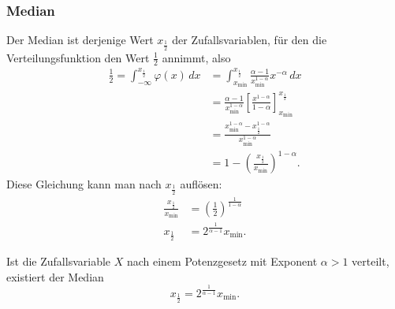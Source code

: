 \subsubsection{Median} \label{subsubsection-median}
Der Median ist derjenige Wert $x_{\frac12}$ der Zufallsvariablen,
für den die Verteilungsfunktion den Wert $\frac12$ annimmt, also
\begin{align*}
\frac12=\int_{-\infty}^{x_{\frac12}}\varphi(x)\,dx
&=
\int_{x_{\min}}^{x_{\frac12}}
\frac{\alpha-1}{x_{\min}^{1-\alpha}}
x^{-\alpha}\,dx
\\
&=
\frac{\alpha-1}{x_{\min}^{1-\alpha}}\left[
\frac{x^{1-\alpha}}{1-\alpha}
\right]_{x_{\min}}^{x_{\frac12}}
\\
&=
\frac{x_{\min}^{1-\alpha}-x_{\frac12}^{1-\alpha}}{x_{\min}^{1-\alpha}}
\\
&=
1-\left(
\frac{x_{\frac12}}{x_{\min}}
\right)^{1-\alpha}.
\end{align*}
Diese Gleichung kann man nach $x_{\frac12}$ auflösen:
\begin{align*}
\frac{x_{\frac12}}{x_{\min}}
&=
\left(\frac12\right)^{\frac1{1-\alpha}}
\\
x_{\frac12}&=2^{\frac1{\alpha-1}}x_{\min}.
\end{align*}
\begin{satz}
Ist die Zufallsvariable $X$ nach einem Potenzgesetz mit Exponent $\alpha>1$
verteilt, existiert der Median
\[
x_{\frac12}=2^{\frac1{\alpha-1}}x_{\min}.
\]
\end{satz}
